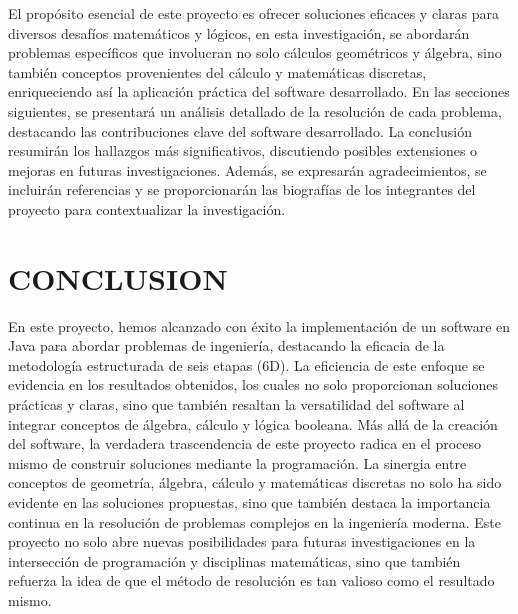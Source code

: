 \documentclass{IEEEcsmag}
\begin{document}
El propósito esencial de este proyecto es ofrecer soluciones eficaces y claras para diversos desafíos matemáticos y lógicos, en esta investigación, se abordarán problemas específicos que involucran no solo cálculos geométricos y álgebra, sino también conceptos provenientes del cálculo y matemáticas discretas, enriqueciendo así la aplicación práctica del software desarrollado. 
En las secciones siguientes, se presentará un análisis detallado de la resolución de cada problema, destacando las contribuciones clave del software desarrollado. La conclusión resumirán los hallazgos más significativos, discutiendo posibles extensiones o mejoras en futuras investigaciones. Además, se expresarán agradecimientos, se incluirán referencias y se proporcionarán las biografías de los integrantes del proyecto para contextualizar la investigación. 

\clearpage


\clearpage


\clearpage


\clearpage


\clearpage


\clearpage


\clearpage


\section{CONCLUSION}
En este proyecto, hemos alcanzado con éxito la implementación de un software en Java para abordar problemas de ingeniería, destacando la eficacia de la metodología estructurada de seis etapas (6D). La eficiencia de este enfoque se evidencia en los resultados obtenidos, los cuales no solo proporcionan soluciones prácticas y claras, sino que también resaltan la versatilidad del software al integrar conceptos de álgebra, cálculo y lógica booleana. 
Más allá de la creación del software, la verdadera trascendencia de este proyecto radica en el proceso mismo de construir soluciones mediante la programación. La sinergia entre conceptos de geometría, álgebra, cálculo y matemáticas discretas no solo ha sido evidente en las soluciones propuestas, sino que también destaca la importancia continua en la resolución de problemas complejos en la ingeniería moderna. Este proyecto no solo abre nuevas posibilidades para futuras investigaciones en la intersección de programación y disciplinas matemáticas, sino que también refuerza la idea de que el método de resolución es tan valioso como el resultado mismo.
\vspace*{-8pt}
\end{document}
